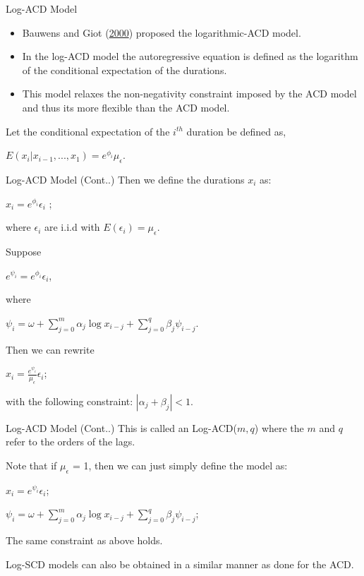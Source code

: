 \documentclass[
  ignorenonframetext,
]{beamer}
\begin{document}
\begin{frame}{Log-ACD Model}
\protect\hypertarget{log-acd-model}{}
\begin{itemize}
\item
  Bauwens and Giot (\protect\hyperlink{ref-LogACD}{2000}) proposed the
  logarithmic-ACD model.
\item
  In the log-ACD model the autoregressive equation is defined as the
  logarithm of the conditional expectation of the durations.
\item
  This model relaxes the non-negativity constraint imposed by the ACD
  model and thus its more flexible than the ACD model.
\end{itemize}

Let the conditional expectation of the \(i^{th}\) duration be defined
as,

\(E(x_i | x_{i-1}, ..., x_1) = e^{\phi_i} \mu_{\epsilon}\).
\end{frame}

\begin{frame}{Log-ACD Model (Cont..)}
\protect\hypertarget{log-acd-model-cont..}{}
Then we define the durations \(x_i\) as:

\(x_i = e^{\phi_i} \epsilon_i\) ;

where \(\epsilon_i\) are i.i.d with \(E(\epsilon_i)=\mu_{\epsilon}\).

Suppose

\(e^{\psi_i} = e^{\phi_i} \epsilon_i\),

where

\(\psi_i = \omega + \sum_{j=0}^m \alpha_j \log x_{i-j} + \sum_{j=0}^q \beta_j \psi_{i-j}\).

Then we can rewrite

\(x_i = \frac{e^{\psi_i}}{\mu_{\epsilon}} \epsilon_i\);

with the following constraint: \(|\alpha_j + \beta_j| < 1\).
\end{frame}

\begin{frame}{Log-ACD Model (Cont..)}
\protect\hypertarget{log-acd-model-cont..-1}{}
This is called an Log-ACD(\(m, q\)) where the \(m\) and \(q\) refer to
the orders of the lags.

Note that if \(\mu_{\epsilon}\) = 1, then we can just simply define the
model as:

\(x_i = e^{\psi_i} \epsilon_i\);

\(\psi_i = \omega + \sum_{j=0}^m \alpha_j \log x_{i-j} + \sum_{j=0}^q \beta_j \psi_{i-j}\);

The same constraint as above holds.

Log-SCD models can also be obtained in a similar manner as done for the
ACD.
\end{frame}
\end{document}
